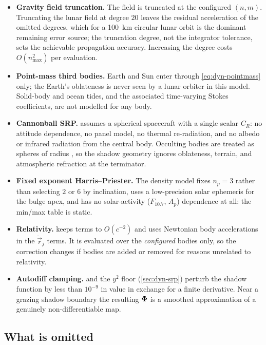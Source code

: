 \begin{itemize}[leftmargin=1.4em]
  \item \textbf{Gravity field truncation.} The field is truncated at the
    configured $(n,m)$. Truncating the lunar field at degree $20$ leaves the
    residual acceleration of the omitted degrees, which for a
    \SI{100}{\kilo\meter} circular lunar orbit is the dominant remaining error
    source; the truncation degree, not the integrator tolerance, sets the
    achievable propagation accuracy. Increasing the degree costs
    $O(n_\mathrm{max}^2)$ per evaluation.
  \item \textbf{Point-mass third bodies.} Earth and Sun enter through
    \cref{eq:dyn-pointmass} only; the Earth's oblateness is never seen by a lunar
    orbiter in this model. Solid-body and ocean tides, and the associated
    time-varying Stokes coefficients, are not modelled for any body.
  \item \textbf{Cannonball SRP.}  assumes a spherical spacecraft
    with a single scalar $C_R$: no attitude dependence, no panel model, no
    thermal re-radiation, and no albedo or infrared radiation from the central
    body. Occulting bodies are treated as spheres of radius , so
    the shadow geometry ignores oblateness, terrain, and atmospheric refraction
    at the terminator.
  \item \textbf{Fixed exponent Harris--Priester.} The density model fixes
    $n_p=3$ rather than selecting $2$ or $6$ by inclination, uses a low-precision
    solar ephemeris for the bulge apex, and has no solar-activity ($F_{10.7}$,
    $A_p$) dependence at all: the min/max table is static.
  \item \textbf{Relativity.}  keeps terms to $O(c^{-2})$ and
    uses Newtonian body accelerations in the $\ddot{\vec{r}}_j$ terms. It is
    evaluated over the \emph{configured} bodies only, so the correction changes
    if bodies are added or removed for reasons unrelated to relativity.
  \item \textbf{Autodiff clamping.}  and the $y^2$ floor
    (\cref{sec:dyn-srp}) perturb the shadow function by less than $10^{-9}$ in
    value in exchange for a finite derivative. Near a grazing shadow boundary the
    resulting $\bm{\Phi}$ is a smoothed approximation of a genuinely
    non-differentiable map.
\end{itemize}

\subsection{What is omitted}

